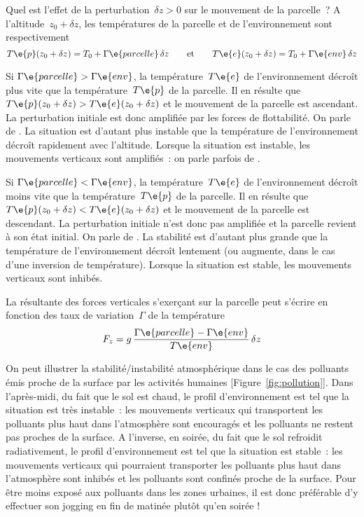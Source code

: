 \sk
Quel est l'effet de la perturbation~$\delta z > 0$ sur le mouvement de la parcelle~? A l'altitude~$z_0 + \delta z$, les températures de la parcelle et de l'environnement sont respectivement
\[ T\e{p}(z_0 + \delta z) = T_0 + \Gamma\e{parcelle} \, \delta z 
\qquad \text{et} \qquad
T\e{e}(z_0 + \delta z) = T_0 + \Gamma\e{env} \, \delta z \]
\begin{finger}
\item Si $\Gamma\e{parcelle} > \Gamma\e{env}$, la température~$T\e{e}$ de l'environnement décroît plus vite que la température~$T\e{p}$ de la parcelle. Il en résulte que~$T\e{p}(z_0 + \delta z) > T\e{e}(z_0 + \delta z)$ et le mouvement de la parcelle est ascendant. La perturbation initiale est donc amplifiée par les forces de flottabilité. On parle de . La situation est d'autant plus instable que la température de l'environnement décroît rapidement avec l'altitude. Lorsque la situation est instable, les mouvements verticaux sont amplifiés~: on parle parfois de .
\item Si $\Gamma\e{parcelle} < \Gamma\e{env}$, la température~$T\e{e}$ de l'environnement décroît moins vite que la température~$T\e{p}$ de la parcelle. Il en résulte que~$T\e{p}(z_0 + \delta z) < T\e{e}(z_0 + \delta z)$ et le mouvement de la parcelle est descendant. La perturbation initiale n'est donc pas amplifiée et la parcelle revient à son état initial. On parle de . La stabilité est d'autant plus grande que la température de l'environnement décroît lentement (ou augmente, dans le cas d'une inversion de température). Lorsque la situation est stable, les mouvements verticaux sont inhibés.
\end{finger}
La résultante des forces verticales s'exerçant sur la parcelle peut s'écrire en fonction des taux de variation~$\Gamma$ de la température
\[ F_z = g \, \frac{\Gamma\e{parcelle}-\Gamma\e{env}}{T\e{env}} \, \delta z \]

\sk
On peut illustrer la stabilité/instabilité atmosphérique dans le cas des polluants émis proche de la surface par les activités humaines [Figure~\ref{fig:pollution}]. Dans l'après-midi, du fait que le sol est chaud, le profil d'environnement est tel que la situation est très instable~: les mouvements verticaux qui transportent les polluants plus haut dans l'atmosphère sont encouragés et les polluants ne restent pas proches de la surface. A l'inverse, en soirée, du fait que le sol refroidit radiativement, le profil d'environnement est tel que la situation est stable~: les mouvements verticaux qui pourraient transporter les polluants plus haut dans l'atmosphère sont inhibés et les polluants sont confinés proche de la surface. Pour être moins exposé aux polluants dans les zones urbaines, il est donc préférable d'y effectuer son jogging en fin de matinée plutôt qu'en soirée !

